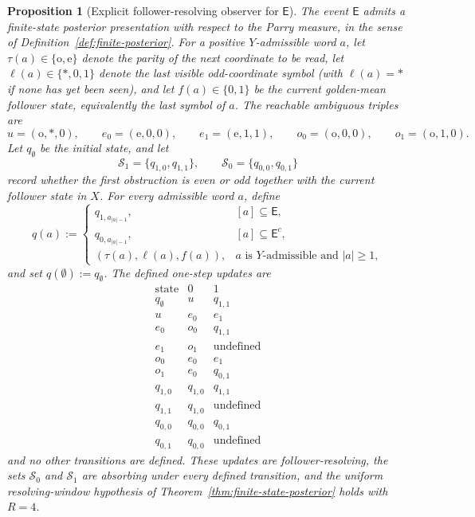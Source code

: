 \documentclass{etds}%
\numberwithin{equation}{section}
\theoremstyle{plain}
\newtheorem{proposition}[theorem]{Proposition}
\theoremstyle{definition}
\theoremstyle{remark}
\begin{document}
\begin{proposition}[Explicit follower-resolving observer for $\mathsf{E}$]
\label{prop:golden-finite-posterior}
The event $\mathsf{E}$ admits a finite-state posterior presentation with
respect to the Parry measure, in the sense of
Definition~\ref{def:finite-posterior}.  For a positive
$Y$-admissible word $a$, let $\tau(a)\in\{\mathrm{o},\mathrm{e}\}$ denote the
parity of the next coordinate to be read, let $\ell(a)\in\{\ast,0,1\}$ denote
the last visible odd-coordinate symbol (with $\ell(a)=\ast$ if none has yet
been seen), and let $f(a)\in\{0,1\}$ be the current golden-mean follower
state, equivalently the last symbol of $a$.  The reachable ambiguous triples
are
\[
u=(\mathrm{o},\ast,0),\qquad
e_0=(\mathrm{e},0,0),\qquad
e_1=(\mathrm{e},1,1),\qquad
o_0=(\mathrm{o},0,0),\qquad
o_1=(\mathrm{o},1,0).
\]
Let $q_\emptyset$ be the initial state, and let
\[
\mathcal{S}_1=\{q_{1,0},q_{1,1}\},
\qquad
\mathcal{S}_0=\{q_{0,0},q_{0,1}\}
\]
record whether the first obstruction is even or odd together with the current
follower state in $X$.  For every admissible word $a$, define
\[
q(a):=
\begin{cases}
q_{1,a_{|a|-1}}, & [a]\subseteq \mathsf{E},\\
q_{0,a_{|a|-1}}, & [a]\subseteq \mathsf{E}^c,\\
(\tau(a),\ell(a),f(a)), & a\text{ is }Y\text{-admissible and }|a|\ge 1,
\end{cases}
\]
and set $q(\emptyset):=q_\emptyset$.  The defined one-step updates are
\[
\begin{array}{c|cc}
\text{state} & 0 & 1\\
\hline
q_\emptyset & u & q_{1,1}\\
u & e_0 & e_1\\
e_0 & o_0 & q_{1,1}\\
e_1 & o_1 & \text{undefined}\\
o_0 & e_0 & e_1\\
o_1 & e_0 & q_{0,1}\\
q_{1,0} & q_{1,0} & q_{1,1}\\
q_{1,1} & q_{1,0} & \text{undefined}\\
q_{0,0} & q_{0,0} & q_{0,1}\\
q_{0,1} & q_{0,0} & \text{undefined}
\end{array}
\]
and no other transitions are defined.  These updates are follower-resolving,
the sets $\mathcal{S}_0$ and $\mathcal{S}_1$ are absorbing under every defined transition, and the
uniform resolving-window hypothesis of Theorem~\ref{thm:finite-state-posterior}
holds with $R=4$.


\end{proposition}
\end{document}
